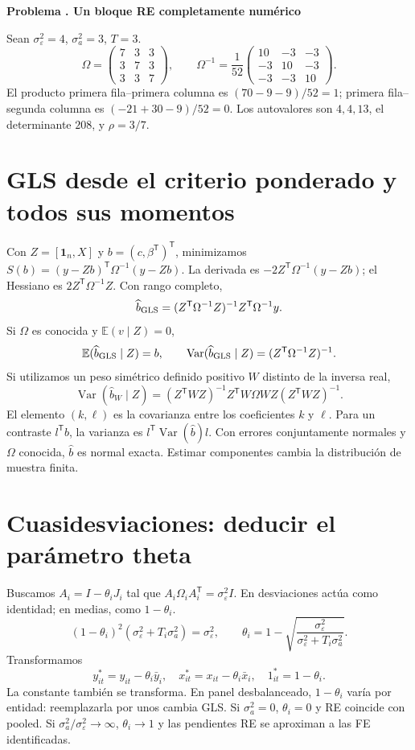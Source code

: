 \documentclass[11pt,a4paper]{article}
\newcommand{\E}{\mathbb E}
\newcommand{\T}{^{\mathsf T}}
\DeclareMathOperator{\Var}{Var}
\newcommand{\ones}{\mathbf 1}
\theoremstyle{definition}
\newcounter{problema}
\newenvironment{resuelto}[1]{\refstepcounter{problema}\par\medskip\Needspace{6\baselineskip}\textbf{Problema \theproblema. #1}\par}{\par\medskip}
\newcommand{\eps}{\varepsilon}
\begin{document}
\begin{resuelto}{Un bloque RE completamente numérico}
Sean $\sigma_\eps^2=4$, $\sigma_a^2=3$, $T=3$.
\[
\Omega=\begin{pmatrix}7&3&3\\3&7&3\\3&3&7\end{pmatrix},
\qquad
\Omega^{-1}=\frac1{52}
\begin{pmatrix}10&-3&-3\\-3&10&-3\\-3&-3&10\end{pmatrix}.
\]
El producto primera fila--primera columna es $(70-9-9)/52=1$; primera fila--segunda columna es $(-21+30-9)/52=0$. Los autovalores son $4,4,13$, el determinante $208$, y $\rho=3/7$.
\end{resuelto}

\section{GLS desde el criterio ponderado y todos sus momentos}
Con $Z=[\ones_n,X]$ y $b=(c,\beta\T)\T$, minimizamos
$S(b)=(y-Zb)\T\Omega^{-1}(y-Zb)$.
La derivada es $-2Z\T\Omega^{-1}(y-Zb)$; el Hessiano es $2Z\T\Omega^{-1}Z$.
Con rango completo,
\[
\widehat b_{\rm GLS}=(Z\T\Omega^{-1}Z)^{-1}Z\T\Omega^{-1}y.
\]
Si $\Omega$ es conocida y $\E(v\mid Z)=0$,
\[
\E(\widehat b_{\rm GLS}\mid Z)=b,\qquad
\Var(\widehat b_{\rm GLS}\mid Z)=(Z\T\Omega^{-1}Z)^{-1}.
\]
Si utilizamos un peso simétrico definido positivo $W$ distinto de la inversa real,
\[
\Var(\widehat b_W\mid Z)
=(Z\T WZ)^{-1}Z\T W\Omega WZ(Z\T WZ)^{-1}.
\]
El elemento $(k,\ell)$ es la covarianza entre los coeficientes $k$ y $\ell$.
Para un contraste $l\T b$, la varianza es
$l\T\Var(\widehat b)l$. Con errores conjuntamente normales y $\Omega$ conocida, $\widehat b$ es normal exacta. Estimar componentes cambia la distribución de muestra finita.

\section{Cuasidesviaciones: deducir el parámetro theta}
Buscamos $A_i=I-\theta_iJ_i$ tal que $A_i\Omega_iA_i\T=\sigma_\eps^2I$.
En desviaciones actúa como identidad; en medias, como $1-\theta_i$.
\[
(1-\theta_i)^2(\sigma_\eps^2+T_i\sigma_a^2)=\sigma_\eps^2,
\qquad
\theta_i=1-\sqrt{\frac{\sigma_\eps^2}{\sigma_\eps^2+T_i\sigma_a^2}}.
\]
Transformamos
\[
y_{it}^*=y_{it}-\theta_i\bar y_i,\quad
x_{it}^*=x_{it}-\theta_i\bar x_i,\quad
1_{it}^*=1-\theta_i.
\]
La constante también se transforma. En panel desbalanceado, $1-\theta_i$ varía por entidad: reemplazarla por unos cambia GLS.
Si $\sigma_a^2=0$, $\theta_i=0$ y RE coincide con pooled.
Si $\sigma_a^2/\sigma_\eps^2\to\infty$, $\theta_i\to1$ y las pendientes RE se aproximan a las FE identificadas.
\end{document}
